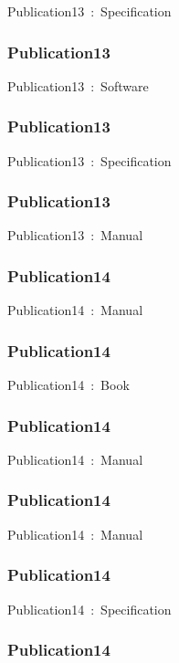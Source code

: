 \documentclass{article}
\begin{document}
Publication13~:~Specification

\subsubsection*{Publication13}

Publication13~:~Software

\subsubsection*{Publication13}

Publication13~:~Specification

\subsubsection*{Publication13}

Publication13~:~Manual

\subsubsection*{Publication14}

Publication14~:~Manual

\subsubsection*{Publication14}

Publication14~:~Book

\subsubsection*{Publication14}

Publication14~:~Manual

\subsubsection*{Publication14}

Publication14~:~Manual

\subsubsection*{Publication14}

Publication14~:~Specification

\subsubsection*{Publication14}
\end{document}
